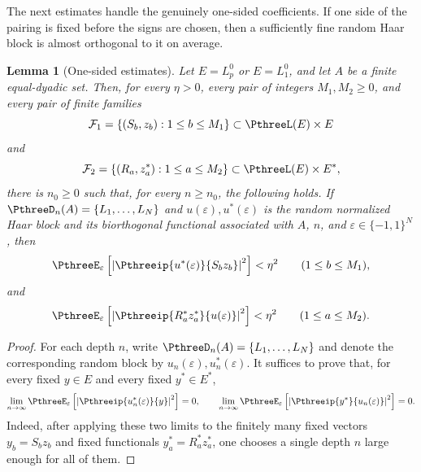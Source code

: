 \documentclass[11pt,reqno]{amsart}
\makeatletter
\theoremstyle{plain}
\newtheorem{lemma}[lemma]{Lemma}
\theoremstyle{definition}
\newcounter{problempaper}
\newenvironment{problempaperbody}{%
  \setcounter{subsection}{0}%
  \setcounter{subsubsection}{0}%
  \setcounter{paragraph}{0}%
  \renewcommand{\thesubsection}{\arabic{subsection}}%
  \renewcommand{\thesubsubsection}{\thesubsection.\arabic{subsubsection}}%
  \renewcommand{\theparagraph}{\thesubsubsection.\arabic{paragraph}}%
  \let\problem@outersection\section
  \let\problem@outersubsection\subsection
  \let\problem@outersubsubsection\subsubsection
  \let\problem@outerparagraph\paragraph
  \let\section\problem@papersection
  \let\subsection\problem@papersubsection
  \let\subsubsection\problem@papersubsubsection
}{%
  \let\section\problem@outersection
  \let\subsection\problem@outersubsection
  \let\subsubsection\problem@outersubsubsection
  \let\paragraph\problem@outerparagraph
}
\newcommand{\problem@target}[2]{%
  \hypertarget{problem-\theproblempaper-#1-#2}{}%
}
\newcommand{\problem@paperheading}[3]{%
  \par\bigskip
  \problem@target{#1}{#2}%
  \noindent{\large\bfseries #2.\quad #3\par}%
  \nobreak\smallskip
}
\newcommand{\problem@papersubheading}[3]{%
  \par\medskip
  \problem@target{#1}{#2}%
  \noindent{\normalsize\bfseries #2.\quad #3\par}%
  \nobreak\smallskip
}
\newcommand{\problem@papersubsubheading}[3]{%
  \par\smallskip
  \problem@target{#1}{#2}%
  \noindent{\normalsize\itshape #2.\quad #3.\ }%
}
\def\problem@papersection{%
  \@ifstar{\problem@papersectionstar}{\problem@papersectionnostar}%
}
\def\problem@papersectionstar#1{%
  \par\bigskip\noindent{\large\bfseries #1\par}\nobreak\smallskip
}
\def\problem@papersectionnostar#1{%
  \refstepcounter{subsection}%
  \setcounter{subsubsection}{0}%
  \setcounter{paragraph}{0}%
  \problem@paperheading{section}{\thesubsection}{#1}%
  \problem@writecontentsline{section}{\thesubsection}{#1}%
}
\def\problem@papersubsection{%
  \@ifstar{\problem@papersubsectionstar}{\problem@papersubsectionnostar}%
}
\def\problem@papersubsectionstar#1{%
  \par\medskip\noindent{\normalsize\bfseries #1\par}\nobreak\smallskip
}
\def\problem@papersubsectionnostar#1{%
  \refstepcounter{subsubsection}%
  \setcounter{paragraph}{0}%
  \problem@papersubheading{subsection}{\thesubsubsection}{#1}%
  \problem@writecontentsline{subsection}{\thesubsubsection}{#1}%
}
\def\problem@papersubsubsection{%
  \@ifstar{\problem@papersubsubsectionstar}{\problem@papersubsubsectionnostar}%
}
\def\problem@papersubsubsectionstar#1{%
  \par\smallskip\noindent{\normalsize\itshape #1.\ }%
}
\def\problem@papersubsubsectionnostar#1{%
  \refstepcounter{paragraph}%
  \problem@papersubsubheading{subsubsection}{\theparagraph}{#1}%
  \problem@writecontentsline{subsubsection}{\theparagraph}{#1}%
}
\newcommand{\problem@writecontentsline}[3]{%
  \begingroup
  \protected@write\@auxout{}{%
    \string\problemcontentsentry{\theproblempaper}{#1}{#2}{#3}{\thepage}%
  }%
  \endgroup
}
\newcommand{\problemcontentsentry}[5]{%
  \@ifundefined{problemcontents@#1}{%
    \expandafter\gdef\csname problemcontents@#1\endcsname{}%
  }{}%
  \expandafter\g@addto@macro\csname problemcontents@#1\endcsname{%
    \problemcontentsline{#1}{#2}{#3}{#4}{#5}%
  }%
}
\newcommand{\problemcontentslink}[4]{%
  \hyperlink{problem-#1-#2-#3}{#4}%
}
\newcommand{\problemcontentsline}[5]{%
  \ifstrequal{#2}{section}{%
    \par\noindent
    \problemcontentslink{#1}{#2}{#3}{\makebox[2.5em][l]{#3}#4}%
    \nobreak\dotfill
    \problemcontentslink{#1}{#2}{#3}{#5}\par
  }{%
    \ifstrequal{#2}{subsection}{%
      \par\noindent\hspace*{1.5em}%
      \problemcontentslink{#1}{#2}{#3}{\makebox[3.5em][l]{#3}#4}%
      \nobreak\dotfill
      \problemcontentslink{#1}{#2}{#3}{#5}\par
    }{%
      \par\noindent\hspace*{3em}%
      \problemcontentslink{#1}{#2}{#3}{\makebox[4.5em][l]{#3}#4}%
      \nobreak\dotfill
      \problemcontentslink{#1}{#2}{#3}{#5}\par
    }%
  }%
}
\makeatother
\begin{document}
\begin{problempaperbody}
The next estimates handle the genuinely one-sided coefficients. If one side of the pairing is fixed before the signs are chosen, then a sufficiently fine random Haar block is almost orthogonal to it on average.

\begin{lemma}[One-sided estimates]
\label{p3:lem:one-sided}
Let $E=L_p^0$ or $E=L_1^0$, and let $A$ be a finite equal-dyadic set. Then, for every $\eta>0$, every pair of integers $M_1,M_2\geq0$, and every pair of finite families
\begin{equation*}
        \mathcal F_1=\{(S_b,z_b):1\leq b\leq M_1\}\subset \PthreeL(E)\times E
\end{equation*}
and
\begin{equation*}
        \mathcal F_2=\{(R_a,z_a^*):1\leq a\leq M_2\}\subset \PthreeL(E)\times E^*,
\end{equation*}
there is $n_0\geq0$ such that, for every $n\geq n_0$, the following holds. If $\PthreeD_n(A)=\{L_1,\ldots,L_N\}$ and $u(\varepsilon),u^*(\varepsilon)$ is the random normalized Haar block and its biorthogonal functional associated with $A$, $n$, and $\varepsilon\in\{-1,1\}^N$, then
\begin{equation*}
        \PthreeE_\varepsilon\left[\left|\Pthreeip{u^*(\varepsilon)}{S_bz_b}\right|^2\right]<\eta^2\qquad (1\leq b\leq M_1),
\end{equation*}
and
\begin{equation*}
        \PthreeE_\varepsilon\left[\left|\Pthreeip{R_a^*z_a^*}{u(\varepsilon)}\right|^2\right]<\eta^2\qquad (1\leq a\leq M_2).
\end{equation*}
\end{lemma}

\begin{proof}
For each depth $n$, write $\PthreeD_n(A)=\{L_1,\ldots,L_N\}$ and denote the corresponding random block by $u_n(\varepsilon),u_n^*(\varepsilon)$. It suffices to prove that, for every fixed $y\in E$ and every fixed $y^*\in E^*$,
\begin{equation*}
        \lim_{n\to\infty}\PthreeE_\varepsilon\left[\left|\Pthreeip{u_n^*(\varepsilon)}{y}\right|^2\right]=0,\qquad \lim_{n\to\infty}\PthreeE_\varepsilon\left[\left|\Pthreeip{y^*}{u_n(\varepsilon)}\right|^2\right]=0.
\end{equation*}
Indeed, after applying these two limits to the finitely many fixed vectors $y_b=S_bz_b$ and fixed functionals $y_a^*=R_a^*z_a^*$, one chooses a single depth $n$ large enough for all of them.


\end{proof}
\end{problempaperbody}
\end{document}
